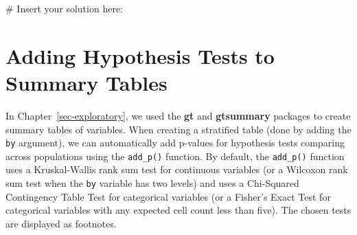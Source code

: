 \documentclass[
  letterpaper,
]{latex/krantz}
\makeatletter
\newenvironment{Shaded}{\begin{snugshade}}{\end{snugshade}}
\newcommand{\CommentTok}[1]{\textcolor[rgb]{0.37,0.37,0.37}{#1}}
\newenvironment{kframe}{%
\medskip{}
\setlength{\fboxsep}{.8em}
 \def\at@end@of@kframe{}%
 \ifinner\ifhmode%
  \def\at@end@of@kframe{\end{minipage}}%
  \begin{minipage}{\columnwidth}%
 \fi\fi%
 \def\FrameCommand##1{\hskip\@totalleftmargin \hskip-\fboxsep
 \colorbox{shadecolor}{##1}\hskip-\fboxsep
     \hskip-\linewidth \hskip-\@totalleftmargin \hskip\columnwidth}%
 \MakeFramed {\advance\hsize-\width
   \@totalleftmargin\z@ \linewidth\hsize
   \@setminipage}}%
 {\par\unskip\endMakeFramed%
 \at@end@of@kframe}
\renewenvironment{Shaded}{\begin{kframe}}{\end{kframe}}
\makeatother
\begin{document}
\begin{Shaded}
\begin{Highlighting}[]
\CommentTok{\# Insert your solution here:}
\end{Highlighting}
\end{Shaded}

\section{\texorpdfstring{Adding Hypothesis Tests to Summary Tables
}{Adding Hypothesis Tests to Summary Tables }}\label{adding-hypothesis-tests-to-summary-tables}

In Chapter~\ref{sec-exploratory}, we used the \textbf{gt}
 and \textbf{gtsummary} packages
 to create summary tables of variables. When
creating a stratified table (done by adding the \texttt{by} argument),
we can automatically add p-values for hypothesis tests comparing across
populations using the
\texttt{add\_p()}
function. By default, the \texttt{add\_p()} function uses a
Kruskal-Wallis rank sum test for continuous variables (or a Wilcoxon
rank sum test when the \texttt{by} variable has two levels) and uses a
Chi-Squared Contingency Table Test for categorical variables (or a
Fisher's Exact Test for categorical variables with any expected cell
count less than five). The chosen tests are displayed as footnotes.
\end{document}
